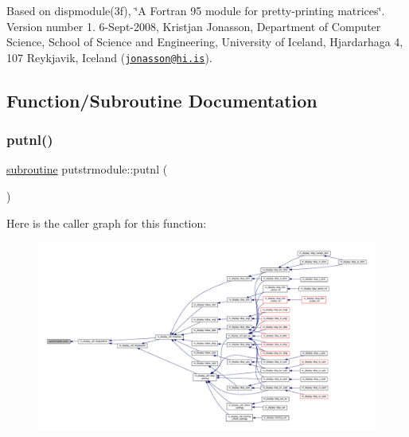 Based on dispmodule(3f), \char`\"{}\+A Fortran 95 module for pretty-\/printing matrices\char`\"{}. Version number 1. 6-\/\+Sept-\/2008, Kristjan Jonasson, Department of Computer Science, School of Science and Engineering, University of Iceland, Hjardarhaga 4, 107 Reykjavik, Iceland (\href{mailto:jonasson@hi.is}{\tt jonasson@hi.\+is}). 

\subsection{Function/\+Subroutine Documentation}
\mbox{\label{namespaceputstrmodule_ab85a50db8f38a797bd4ecf0b00a40e85}} 
\subsubsection{\texorpdfstring{putnl()}{putnl()}}
{\footnotesize\ttfamily \hyperlink{M__stopwatch_83_8txt_acfbcff50169d691ff02d4a123ed70482}{subroutine} putstrmodule\+::putnl (\begin{DoxyParamCaption}{ }\end{DoxyParamCaption})}

Here is the caller graph for this function\+:
\nopagebreak
\begin{figure}[H]
\begin{center}
\leavevmode
\includegraphics[width=350pt]{namespaceputstrmodule_ab85a50db8f38a797bd4ecf0b00a40e85_icgraph}
\end{center}
\end{figure}
\mbox{\label{namespaceputstrmodule_a3557206c6eaead47ecd6a04e58f69f90}} 
